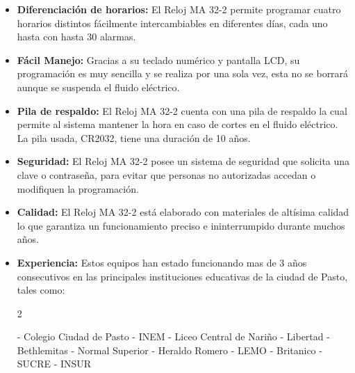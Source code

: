 \documentclass[8pt,notitlepage,openany]{scrbook}
\begin{document}
\begin{itemize}
\item \textbf{Diferenciación de horarios:} El Reloj MA 32-2 permite programar cuatro horarios distintos  fácilmente intercambiables en diferentes días, cada uno hasta con hasta 30 alarmas.

\item \textbf{Fácil Manejo:} Gracias a su teclado numérico y pantalla LCD, su programación es muy sencilla y se realiza por una sola vez, esta no se borrará aunque se suspenda el fluido eléctrico.

\item \textbf{Pila de respaldo:} El Reloj MA 32-2 cuenta con una pila de respaldo la cual permite al sistema mantener la hora en caso de cortes en el fluido eléctrico. La pila usada, CR2032, tiene una duración de 10 años.

\item \textbf{Seguridad:} El Reloj MA 32-2 posee un sistema de seguridad que solicita una clave o contraseña, para evitar que personas no autorizadas accedan o modifiquen la programación.

\item \textbf{Calidad:} El Reloj MA 32-2 está elaborado con materiales de altísima calidad lo que garantiza un funcionamiento preciso e ininterrumpido durante muchos años.

\item \textbf{Experiencia:} Estos equipos han estado funcionando mas de 3 años consecutivos en las principales instituciones educativas de la ciudad de Pasto, tales como: 

\begin{multicols}{2}

\vspace{-0.2cm}\subitem - Colegio Ciudad de Pasto 
\vspace{-0.2cm}\subitem - INEM
\vspace{-0.2cm}\subitem - Liceo Central de Nariño
\vspace{-0.2cm}\subitem - Libertad
\vspace{-0.2cm}\subitem - Bethlemitas
\vspace{-0.2cm}\subitem - Normal Superior
\vspace{-0.2cm}\subitem - Heraldo Romero
\vspace{-0.2cm}\subitem - LEMO
\vspace{-0.2cm}\subitem - Britanico
\vspace{-0.2cm}\subitem - SUCRE
\vspace{-0.2cm}\subitem - INSUR
\end{multicols}

\end{itemize}
\end{document}
